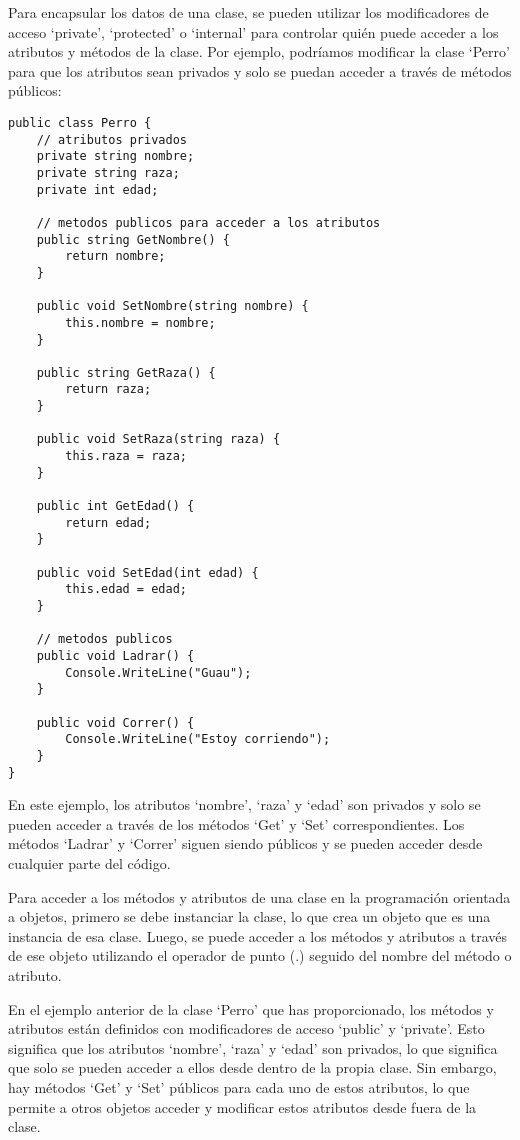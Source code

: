 \documentclass[executivepaper]{article}
\begin{document}
Para encapsular los datos de una clase, se pueden utilizar los modificadores de acceso \enquote*{private}, \enquote*{protected} o \enquote*{internal} para controlar quién puede acceder a los atributos y métodos de la clase. Por ejemplo, podríamos modificar la clase \enquote*{Perro} para que los atributos sean privados y solo se puedan acceder a través de métodos públicos:

\begin{lstlisting}
public class Perro {
    // atributos privados
    private string nombre;
    private string raza;
    private int edad;

    // metodos publicos para acceder a los atributos
    public string GetNombre() {
        return nombre;
    }

    public void SetNombre(string nombre) {
        this.nombre = nombre;
    }

    public string GetRaza() {
        return raza;
    }

    public void SetRaza(string raza) {
        this.raza = raza;
    }

    public int GetEdad() {
        return edad;
    }

    public void SetEdad(int edad) {
        this.edad = edad;
    }

    // metodos publicos
    public void Ladrar() {
        Console.WriteLine("Guau");
    }

    public void Correr() {
        Console.WriteLine("Estoy corriendo");
    }
}
\end{lstlisting}   
En este ejemplo, los atributos \enquote*{nombre}, \enquote*{raza} y \enquote*{edad} son privados y solo se pueden acceder a través de los métodos \enquote*{Get} y \enquote*{Set} correspondientes. Los métodos \enquote*{Ladrar} y \enquote*{Correr} siguen siendo públicos y se pueden acceder desde cualquier parte del código.

Para acceder a los métodos y atributos de una clase en la programación orientada a objetos, primero se debe instanciar la clase, lo que crea un objeto que es una instancia de esa clase. Luego, se puede acceder a los métodos y atributos a través de ese objeto utilizando el operador de punto (.) seguido del nombre del método o atributo.

En el ejemplo anterior de la clase \enquote*{Perro} que has proporcionado, los métodos y atributos están definidos con modificadores de acceso \enquote*{public} y \enquote*{private}. Esto significa que los atributos \enquote*{nombre}, \enquote*{raza} y \enquote*{edad} son privados, lo que significa que solo se pueden acceder a ellos desde dentro de la propia clase. Sin embargo, hay métodos \enquote*{Get} y \enquote*{Set} públicos para cada uno de estos atributos, lo que permite a otros objetos acceder y modificar estos atributos desde fuera de la clase.
\end{document}
